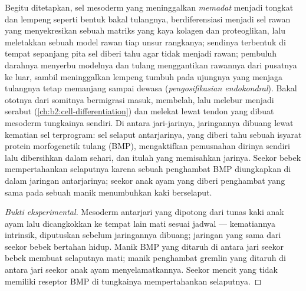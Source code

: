 \begin{proposition}\label{prop:b2:limb-organogenesis:skeleton}
Begitu ditetapkan, sel mesoderm yang meninggalkan 
\emph{memadat} menjadi tongkat dan lempeng seperti bentuk bakal
tulangnya, berdiferensiasi menjadi sel rawan yang menyekresikan sebuah
matriks yang kaya kolagen dan proteoglikan, lalu meletakkan sebuah
model rawan tiap unsur rangkanya; sendinya terbentuk di tempat
sepanjang pita sel diberi tahu agar tidak menjadi rawan; pembuluh
darahnya menyerbu modelnya dan tulang menggantikan rawannya dari
pusatnya ke luar, sambil meninggalkan lempeng tumbuh pada ujungnya yang
menjaga tulangnya tetap memanjang sampai dewasa
(\emph{pengosifikasian endokondral}). Bakal ototnya dari
somitnya bermigrasi masuk, membelah, lalu melebur menjadi serabut
(\cref{ch:b2:cell-differentiation}) dan melekat lewat tendon yang
dibuat mesoderm tungkainya sendiri. Di antara jari-jarinya, jaringannya
dibuang lewat kematian sel terprogram: sel selaput antarjarinya, yang
diberi tahu sebuah isyarat protein morfogenetik tulang (BMP),
mengaktifkan pemusnahan dirinya sendiri lalu dibersihkan dalam sehari,
dan itulah yang memisahkan jarinya. Seekor bebek mempertahankan
selaputnya karena sebuah penghambat BMP diungkapkan di dalam jaringan
antarjarinya; seekor anak ayam yang diberi penghambat yang sama pada
sebuah manik menumbuhkan kaki berselaput.
\end{proposition}
\begin{proof}[Bukti eksperimental]
Mesoderm antarjari yang dipotong dari tunas kaki anak ayam lalu
dicangkokkan ke tempat lain mati sesuai jadwal --- kematiannya
intrinsik, diputuskan sebelum jaringannya dibuang; jaringan yang sama
dari seekor bebek bertahan hidup. Manik BMP yang ditaruh di antara jari
seekor bebek membuat selaputnya mati; manik penghambat gremlin yang
ditaruh di antara jari seekor anak ayam menyelamatkannya. Seekor mencit
yang tidak memiliki reseptor BMP di tungkainya mempertahankan selaputnya.
\end{proof}


